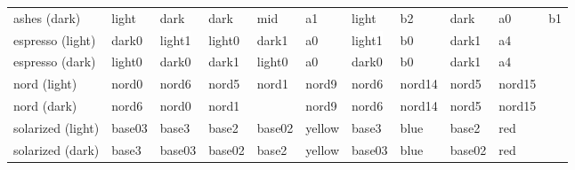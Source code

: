 \documentclass[lowerhead,12pt]{aesthetic}
\begin{document}
\begin{description}[font=\ttfamily]
\begin{landscape}
\begin{table}
\begin{tabular}{M{.1\linewidth}M{.1\linewidth}M{.05\linewidth}M{.1\linewidth}M{.1\linewidth}M{.1\linewidth}M{.1\linewidth}M{.1\linewidth}M{.1\linewidth}M{.1\linewidth}M{.05\linewidth}}
        ashes (dark) & \colorbox[HTML]{f3f3f5}{light} & {\color{white} \colorbox[HTML]{1c1e23}{dark}} & {\color{white} \colorbox[HTML]{1c1e23}{dark}} & {\color{white} \colorbox[HTML]{747a84}{mid}} & {\color{white} \colorbox[HTML]{ac95c7}{a1}} & \colorbox[HTML]{f3f3f5}{light} & {\color{white} \colorbox[HTML]{95acc7}{b2}} & {\color{white} \colorbox[HTML]{1c1e23}{dark}} & \colorbox[HTML]{c7ac95}{a0} & \colorbox[HTML]{acc795}{b1} \\
        es\-pre\-sso (light) & {\color{white} \colorbox[HTML]{323232}{dark0}} & \colorbox{white}{light1} & \colorbox[HTML]{eeeeec}{light0} & {\color{white} \colorbox[HTML]{353535}{dark1}} & {\color{white} \colorbox[HTML]{d25252}{a0}} & \colorbox{white}{light1} & \colorbox[HTML]{6c99bb}{b0} & {\color{white} \colorbox[HTML]{353535}{dark1}} & \colorbox[HTML]{c2e075}{a4} & \\
        es\-pre\-sso (dark) & \colorbox[HTML]{eeeeec}{light0} & {\color{white} \colorbox[HTML]{323232}{dark0}} & {\color{white} \colorbox[HTML]{353535}{dark1}} & \colorbox[HTML]{eeeeec}{light0} & {\color{white} \colorbox[HTML]{d25252}{a0}} & {\color{white} \colorbox[HTML]{323232}{dark0}} & \colorbox[HTML]{6c99bb}{b0} & {\color{white} \colorbox[HTML]{353535}{dark1}} & \colorbox[HTML]{c2e075}{a4} & \\
        nord (light) & {\color{white} \colorbox[HTML]{2E3440}{nord0}} & \colorbox[HTML]{ECEFF4}{nord6} & \colorbox[HTML]{E5E9F0}{nord5} & {\color{white} \colorbox[HTML]{3B4252}{nord1}} & \colorbox[HTML]{81A1C1}{nord9} & \colorbox[HTML]{eceff3}{nord6} & \colorbox[HTML]{A3BE8C}{nord14} & \colorbox[HTML]{e5e9f0}{nord5} & \colorbox[HTML]{B48EAD}{nord15} & \\
        nord (dark) & \colorbox[HTML]{ECEFF4}{nord6} & {\color{white} \colorbox[HTML]{2E3440}{nord0}} & {\color{white} \colorbox[HTML]{3B4252}{nord1}} & &  \colorbox[HTML]{81A1C1}{nord9} & \colorbox[HTML]{eceff3}{nord6} & \colorbox[HTML]{A3BE8C}{nord14} & \colorbox[HTML]{e5e9f0}{nord5} & \colorbox[HTML]{B48EAD}{nord15} & \\
        so\-l\-ar\-iz\-ed (light) & {\color{white} \colorbox[HTML]{002b36}{base03}} & \colorbox[HTML]{fdf6e3}{base3} & \colorbox[HTML]{eee8d5}{base2} & {\color{white} \colorbox[HTML]{073642}{base02}} & \colorbox[HTML]{b58900}{yellow} & \colorbox[HTML]{fdf6e2}{base3} & \colorbox[HTML]{268bd2}{blue} & \colorbox[HTML]{eee8d5}{base2} & \colorbox[HTML]{dc322f}{red} & \\
        so\-l\-ar\-iz\-ed (dark) & \colorbox[HTML]{fdf6e3}{base3} & {\color{white} \colorbox[HTML]{002b36}{base03}} & {\color{white} \colorbox[HTML]{073642}{base02}} & \colorbox[HTML]{eee8d5}{base2} & \colorbox[HTML]{b58900}{yellow} & {\color{white} \colorbox[HTML]{002b3b}{base03}} & \colorbox[HTML]{268bd2}{blue} & {\color{white} \colorbox[HTML]{073642}{base02}} & \colorbox[HTML]{dc322f}{red} & \\

\end{tabular}
\end{table}
\end{landscape}
\end{description}
\end{document}
